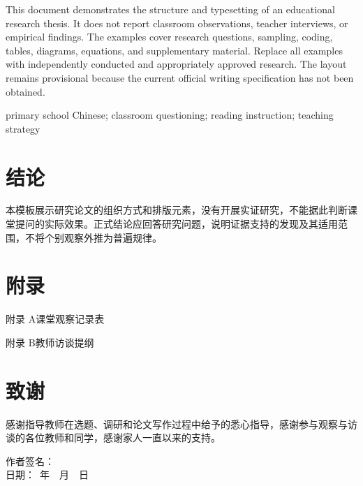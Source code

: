 \documentclass[12pt,a4paper,fontset=none]{ctexart}
\newcommand{\song}{\CJKfamily{zhsong}}
\newcommand{\hei}{\CJKfamily{zhhei}}
\begin{document}
{\rmfamily{}
This document demonstrates the structure and typesetting of an educational research thesis. It does not report classroom observations, teacher interviews, or empirical findings. The examples cover research questions, sampling, coding, tables, diagrams, equations, and supplementary material. Replace all examples with independently conducted and appropriately approved research. The layout remains provisional because the current official writing specification has not been obtained.}

\vspace{0.6em}
 {\rmfamily{}primary school Chinese; classroom questioning; reading instruction; teaching strategy}

\newpage
\tableofcontents
\thispagestyle{empty}

\newpage
{}
\pagestyle{main}


\section{结论}
本模板展示研究论文的组织方式和排版元素，没有开展实证研究，不能据此判断课堂提问的实际效果。正式结论应回答研究问题，说明证据支持的发现及其适用范围，不将个别观察外推为普遍规律。

\newpage
\begingroup
\renewcommand{\bibsection}{%
  \phantomsection
  \addcontentsline{toc}{section}{参考文献}%
  \begin{center}\hei\zihao{3}参考文献\end{center}
  \vspace{0.5\baselineskip}%
}
\renewcommand{\bibfont}{\song\zihao{5}}


\endgroup

\newpage
\section*{附\quad 录}
{\song{}\linespread{1.0}\selectfont
附录 A\quad 课堂观察记录表\par
附录 B\quad 教师访谈提纲\par

}

\newpage
\section*{致\quad 谢}
感谢指导教师在选题、调研和论文写作过程中给予的悉心指导，感谢参与观察与访谈的各位教师和同学，感谢家人一直以来的支持。

\vspace{2cm}
\begin{flushright}
作者签名：\underline{\makebox[3cm]{}}\\[1.2em]
日\quad 期：\underline{\makebox[3cm]{}}\ 年\ \underline{\makebox[1cm]{}}\ 月\ \underline{\makebox[1cm]{}}\ 日
\end{flushright}
\end{document}
